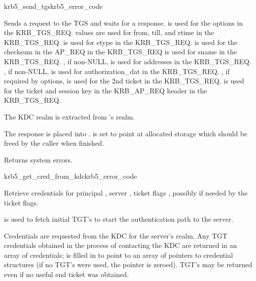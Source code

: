 \begin{funcdecl}{krb5_send_tgs}{krb5_error_code}{\funcin}
\funcinout
{}
\funcout
{}
\end{funcdecl}

Sends a request to the TGS and waits for a response.
 is used for the options in the KRB_TGS_REQ.
 values are used for from, till, and rtime in the
KRB_TGS_REQ.
 is used for etype in the KRB_TGS_REQ.
 is used for the checksum in the AP_REQ in the KRB_TGS_REQ
 is used for sname in the KRB_TGS_REQ.
, if non-NULL, is used for addresses in the KRB_TGS_REQ.
, if non-NULL, is used for authorization_dat in the KRB_TGS_REQ.
, if required by options, is used for the 2nd
ticket in the KRB_TGS_REQ.
 is used for the ticket and session key in the KRB_AP_REQ header in the KRB_TGS_REQ.

The KDC realm is extracted from 's realm.

The response is placed into .
 is set to point at allocated storage
which should be freed by the caller when finished.

Returns system errors.

\begin{funcdecl}{krb5_get_cred_from_kdc}{krb5_error_code}{\funcin}
\funcinout
{}
\funcout			
{}
\end{funcdecl}

Retrieve credentials for principal ,
server ,
ticket flags , possibly
 if needed by the ticket flags.

 is used to fetch initial TGT's to start the authentication
path to the server.

Credentials are requested from the KDC for the server's realm.  Any
TGT credentials obtained in the process of contacting the KDC are
returned in an array of credentials;  is filled in to
point to an array of pointers to credential structures (if no TGT's were
used, the pointer is zeroed).  TGT's may be returned even if no useful
end ticket was obtained.

